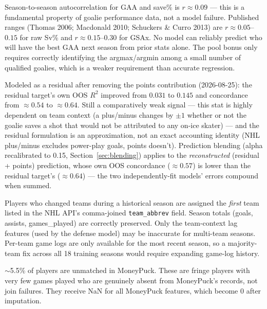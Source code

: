 \documentclass[11pt, a4paper]{article}
\begin{document}
\begin{description}[leftmargin=2.5cm, style=nextline]

  \item[Goalie precision stats]
        Season-to-season autocorrelation for GAA and save\% is $r \approx 0.09$ — this is a
        fundamental property of goalie performance data, not a model failure. Published ranges
        (Thomas 2006; Macdonald 2010; Schuckers \& Curro 2013) are $r \approx 0.05$--$0.15$
        for raw Sv\% and $r \approx 0.15$--$0.30$ for GSAx. No model can reliably predict
        who will have the best GAA next season from prior stats alone. The pool bonus only
        requires correctly identifying the argmax/argmin among a small number of qualified
        goalies, which is a weaker requirement than accurate regression.

  \item[Defense plus/minus]
        Modeled as a residual after removing the points contribution (2026-08-25): the residual
        target's own OOS $R^2$ improved from $0.031$ to $0.145$ and concordance from
        $\approx 0.54$ to $\approx 0.64$. Still a comparatively weak signal — this stat is
        highly dependent on team context (a plus/minus changes by $\pm 1$ whether or not the
        goalie saves a shot that would not be attributed to any on-ice skater) — and the
        residual formulation is an approximation, not an exact accounting identity (NHL
        plus/minus excludes power-play goals, points doesn't). Prediction blending (alpha
        recalibrated to 0.15, Section~\ref{sec:blending}) applies to the \emph{reconstructed}
        (residual + points) prediction, whose own OOS concordance ($\approx 0.57$) is lower than
        the residual target's ($\approx 0.64$) — the two independently-fit models' errors
        compound when summed.

  \item[Traded players — historical team context]
        Players who changed teams during a historical season are assigned the \emph{first}
        team listed in the NHL API's comma-joined \texttt{team\_abbrev} field. Season totals
        (goals, assists, games\_played) are correctly preserved. Only the team-context lag
        features (used by the defense model) may be inaccurate for multi-team seasons.
        Per-team game logs are only available for the most recent season, so a majority-team
        fix across all 18 training seasons would require expanding game-log history.

  \item[MoneyPuck coverage]
        $\sim$5.5\% of players are unmatched in MoneyPuck. These are fringe players with
        very few games played who are genuinely absent from MoneyPuck's records, not join
        failures. They receive NaN for all MoneyPuck features, which become 0 after imputation.


\end{description}
\end{document}
